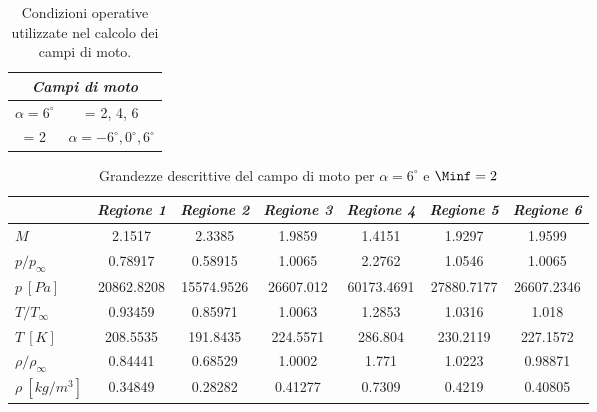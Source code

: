 \begin{table} [!h]\centering {}
	\begin{tabular}{c c}
		\toprule
		\multicolumn{2}{c}{\emph{Campi di moto}}  \\ 
		\midrule
		$\alpha = 6^{\circ}$ & \Minf = 2, 4, 6\\
		\Minf = 2 & $\alpha= -6^{\circ}, 0^{\circ},6^{\circ}$\\
		\bottomrule
	\end{tabular}
	\caption {Condizioni operative utilizzate nel calcolo dei campi di moto.}
	\label{tabs61}
\end{table}

\begin{table} [!h]
	\centering 
	\begin{tabular}{l  c  c c c c c}   
		 \toprule&   
		  \emph{Regione 1}& \emph{Regione 2}& \emph{Regione 3}& \emph{Regione 4}& \emph{Regione 5}& \emph{Regione 6}   \\  \midrule$M$ &2.1517 &2.3385 &1.9859 &1.4151 &1.9297 &1.9599 \\$p/p_{\infty}$ &0.78917 &0.58915 &1.0065 &2.2762 &1.0546 &1.0065 \\
		  $p \ [\si{Pa}]$ &20862.8208 &15574.9526 &26607.012 &60173.4691 &27880.7177 &26607.2346 \\
		  $T/T_{\infty}$ &0.93459&0.85971&1.0063&1.2853&1.0316&1.018\\
		  $T \ [K]$ &208.5535&191.8435&224.5571&286.804&230.2119&227.1572\\
		  $\rho/\rho_{\infty}$ &0.84441&0.68529&1.0002&1.771&1.0223&0.98871\\
		  $\rho \ [kg/m^3]$ &0.34849&0.28282&0.41277&0.7309&0.4219&0.40805\\
		  \bottomrule
		  \end{tabular}
		  \caption {\footnotesize Grandezze descrittive del campo di moto per $\alpha=6^\circ$ e $\Minf=2$}\label{tabS6}
\end{table}			

